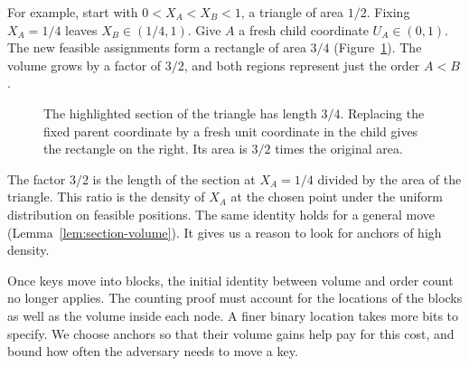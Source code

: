 For example, start with $0<X_A<X_B<1$, a triangle of area $1/2$.
Fixing $X_A=1/4$ leaves $X_B\in(1/4,1)$. Give $A$ a fresh child
coordinate $U_A\in(0,1)$. The new feasible assignments form a rectangle
of area $3/4$ (Figure~\ref{fig:section-volume}). The volume grows by
a factor of $3/2$, and both regions represent just the order $A<B$.

\begin{figure}[!htb]
\centering
{}
\caption{The highlighted section of the triangle has length $3/4$.
Replacing the fixed parent coordinate by a fresh unit coordinate in the
child gives the rectangle on the right. Its area is $3/2$ times the
original area.}
\label{fig:section-volume}
\end{figure}

The factor $3/2$ is the length of the section at $X_A=1/4$ divided by
the area of the triangle. This ratio is the density of $X_A$ at the
chosen point under the uniform distribution on feasible positions.
The same identity holds for a general move
(Lemma~\ref{lem:section-volume}). It gives us a reason to look for
anchors of high density.

Once keys move into blocks, the initial identity between volume and
order count no longer applies. The counting proof must account for
the locations of the blocks as well as the volume inside each node.
A finer binary location takes more bits to specify. We choose anchors
so that their volume gains help pay for this cost, and bound how
often the adversary needs to move a key.

